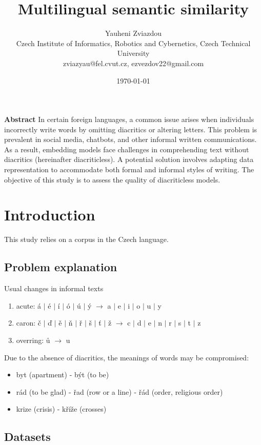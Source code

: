 \documentclass{article}
\title{Multilingual semantic similarity}
\author{Yauheni Zviazdou \\ Czech Institute of Informatics, Robotics and Cybernetics, Czech Technical University \\ zviazyau@fel.cvut.cz, ezvezdov22@gmail.com}
\date{\today}
\begin{document}
\maketitle

\textbf{Abstract} In certain foreign languages, a common issue arises when individuals incorrectly write words by omitting diacritics or altering letters.
This problem is prevalent in social media, chatbots, and other informal written communications.
As a result, embedding models face challenges in comprehending text without diacritics (hereinafter diacriticless).
A potential solution involves adapting data representation to accommodate both formal and informal styles of writing.
The objective of this study is to assess the quality of diacriticless models.


\section{Introduction}
This study relies on a corpus in the Czech language.

\subsection{Problem explanation}

\noindent Usual changes in informal texts 
\begin{enumerate}
  \item acute: á $\vert$ é $\vert$ í $\vert$ ó $\vert$ ú $\vert$ ý $\rightarrow$ a $\vert$ e $\vert$ i $\vert$ o $\vert$ u $\vert$ y
  \item caron: č $\vert$ ď $\vert$ ě $\vert$ ň $\vert$ ř $\vert$ š $\vert$ ť $\vert$ ž $\rightarrow$ c $\vert$ d $\vert$ e $\vert$ n $\vert$ r $\vert$ s $\vert$ t $\vert$ z
  \item overring: ů $\rightarrow$ u
\end{enumerate}

\noindent Due to the absence of diacritics, the meanings of words may be compromised:

\begin{itemize}
  \item byt (apartment) - být (to be)
  \item rád (to be glad) - řad (row or a line) - řád (order, religious order)
  \item krize (crisis) - kříže (crosses)
\end{itemize}

\subsection{Datasets}
\end{document}
